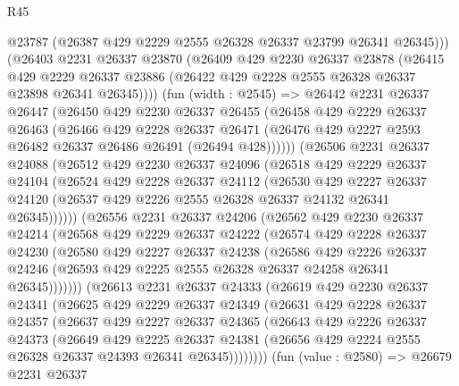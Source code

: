 \begin{lexlean}{R45}
\begin{coremodule}
        @23787
        (@26387 @429 @2229 @2555 @26328 @26337 @23799 @26341 @26345)))
    (@26403
      @2231
      @26337
      @23870
      (@26409
        @429
        @2230
        @26337
        @23878
        (@26415
          @429
          @2229
          @26337
          @23886
          (@26422 @429 @2228 @2555 @26328 @26337 @23898 @26341 @26345))))
    (fun (width : @2545) =>
    @26442
      @2231
      @26337
      @26447
      (@26450
        @429
        @2230
        @26337
        @26455
        (@26458
          @429
          @2229
          @26337
          @26463
          (@26466
            @429
            @2228
            @26337
            @26471
            (@26476 @429 @2227 @2593 @26482 @26337 @26486 @26491 (@26494 @428))))))
    (@26506
      @2231
      @26337
      @24088
      (@26512
        @429
        @2230
        @26337
        @24096
        (@26518
          @429
          @2229
          @26337
          @24104
          (@26524
            @429
            @2228
            @26337
            @24112
            (@26530
              @429
              @2227
              @26337
              @24120
              (@26537 @429 @2226 @2555 @26328 @26337 @24132 @26341 @26345))))))
    (@26556
      @2231
      @26337
      @24206
      (@26562
        @429
        @2230
        @26337
        @24214
        (@26568
          @429
          @2229
          @26337
          @24222
          (@26574
            @429
            @2228
            @26337
            @24230
            (@26580
              @429
              @2227
              @26337
              @24238
              (@26586
                @429
                @2226
                @26337
                @24246
                (@26593 @429 @2225 @2555 @26328 @26337 @24258 @26341 @26345)))))))
    (@26613
      @2231
      @26337
      @24333
      (@26619
        @429
        @2230
        @26337
        @24341
        (@26625
          @429
          @2229
          @26337
          @24349
          (@26631
            @429
            @2228
            @26337
            @24357
            (@26637
              @429
              @2227
              @26337
              @24365
              (@26643
                @429
                @2226
                @26337
                @24373
                (@26649
                  @429
                  @2225
                  @26337
                  @24381
                  (@26656 @429 @2224 @2555 @26328 @26337 @24393 @26341 @26345))))))))
    (fun (value : @2580) =>
    @26679
      @2231
      @26337

\end{coremodule}
\end{lexlean}
